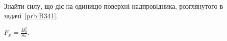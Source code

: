 

\begin{problem}
Знайти силу, що діє на одиницю поверхні надпровідника, розглянутого в задачі~\ref{prb:B341}.
\begin{solution}
	$F_x = \frac{H_0^2}{8\pi}$.
\end{solution}
\end{problem}


